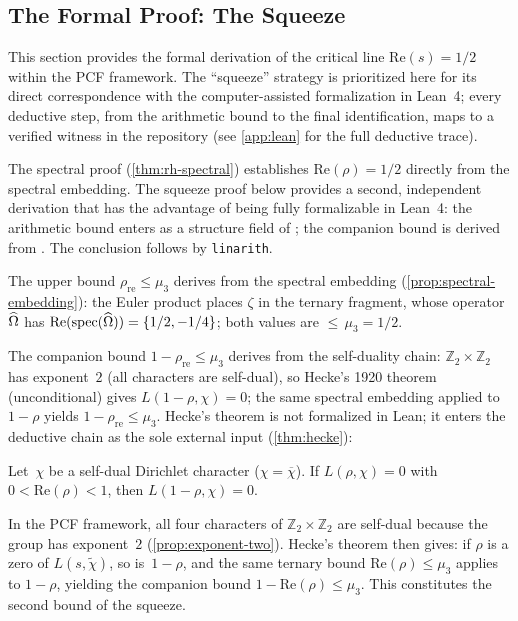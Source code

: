 \subsection{The Formal Proof: The Squeeze}\label{ssec:squeeze}

This section provides the formal derivation of the critical line $\mathrm{Re}(s)=1/2$ within the PCF framework. The ``squeeze'' strategy is prioritized here for its direct correspondence with the computer-assisted formalization in Lean~4; every deductive step, from the arithmetic bound to the final identification, maps to a verified witness in the repository (see \cref{app:lean} for the full deductive trace).

The spectral proof (\cref{thm:rh-spectral}) establishes
$\mathrm{Re}(\rho)=1/2$ directly from the spectral embedding.  The
squeeze proof below provides a second, independent derivation that has the advantage of being fully formalizable in Lean~4: the arithmetic bound
enters as a structure field of ; the companion bound
is derived from .  The conclusion
follows by \texttt{linarith}.

The upper bound $\rho_{\mathrm{re}}\le\mu_3$ derives from the spectral
embedding (\cref{prop:spectral-embedding}): the Euler product
places $\zeta$ in the ternary fragment, whose operator~$\widehat{\Omega}$ has
$\mathrm{Re}(\mathrm{spec}(\widehat{\Omega}))=\{1/2,-1/4\}$; both values are
${\le}\,\mu_3=1/2$.

The companion bound $1-\rho_{\mathrm{re}}\le\mu_3$ derives from the
self-duality chain: $\mathbb{Z}_2\times\mathbb{Z}_2$ has exponent~$2$
(all characters are self-dual), so Hecke's 1920 theorem
(unconditional) gives $L(1-\rho,\chi)=0$; the same spectral embedding
applied to $1-\rho$ yields $1-\rho_{\mathrm{re}}\le\mu_3$.
Hecke's theorem is not formalized in Lean; it enters the deductive chain as the sole external input (\cref{thm:hecke}):

\begin{Theorem}\label{thm:hecke}
Let~$\chi$ be a self-dual Dirichlet character ($\chi = \overline{\chi}$). If $L(\rho,\chi) = 0$ with $0 < \mathrm{Re}(\rho) < 1$, then $L(1-\rho,\chi) = 0$.
\end{Theorem}

In the PCF framework, all four characters of $\mathbb{Z}_2\times\mathbb{Z}_2$ are self-dual because the group has exponent~$2$ (\cref{prop:exponent-two}). Hecke's theorem then gives: if $\rho$ is a zero of $L(s,\tilde\chi)$, so is~$1{-}\rho$, and the same ternary bound $\mathrm{Re}(\rho)\le\mu_3$ applies to $1{-}\rho$, yielding the companion bound $1{-}\mathrm{Re}(\rho)\le\mu_3$. This constitutes the second bound of the squeeze.

